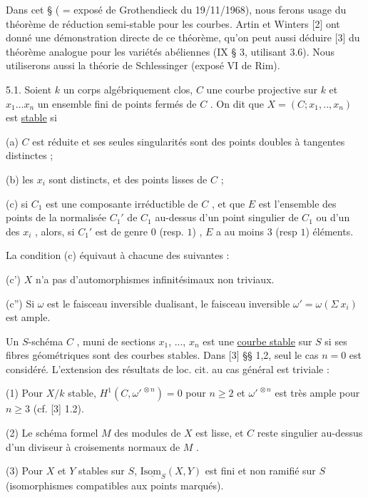 Dans cet § ( = exposé de Grothendieck du 19/11/1968), nous ferons usage du théorème de réduction semi-stable pour les courbes. Artin et Winters [2] ont donné une démonstration directe de ce théorème, qu'on peut aussi déduire [3] du théorème analogue pour les variétés abéliennes (IX § 3, utilisant 3.6). Nous utiliserons aussi la théorie de  Schlessinger (exposé VI de  Rim).

5.1.  Soient  $k$  un corps algébriquement clos, $C$ une courbe projective sur  $k$  et $x_1 \ldots x_n$  un ensemble fini de points fermés de  $C$ . On dit que  $X = (C ; x_1,.., x_n)$ est \underline{stable} si

(a) $C$ est réduite et ses seules singularités sont des points doubles à tangentes distinctes ;

(b) les  $x_i$  sont distincts, et des points lisses de  $C$ ;

(c) si  $C_1$  est une composante irréductible de  $C$ , et que  $E$  est l'ensemble des points de la normalisée  $C_1'$  de  $C_1$  au-dessus d'un point singulier de  $C_1$  ou d'un des  $x_i$ , alors, si  $C_1'$  est de genre  $0$  (resp. $1$) ,  $E$  a au moins  $3$ (resp $1$) éléments.

La condition (c) équivaut à chacune des suivantes :

(c')  $X$  n'a pas d'automorphismes infinitésimaux non triviaux.

(c'')  Si  $\omega$  est le faisceau inversible dualisant, le faisceau inversible $\omega' = \omega(\Sigma\ x_i)$  est ample.

Un  $S$-schéma  $C$ , muni de sections  $x_1$, ...,  $x_n$  est une \underline{courbe stable}  sur $S$  si ses fibres géométriques sont des courbes stables. Dans [3] §§ 1,2, seul le cas $n = 0$  est considéré. L'extension des résultats de loc. cit. au cas général est triviale :

(1) Pour  $X/k$  stable,  $H^1(C,\omega'^{\,\otimes n}) = 0$  pour  $n \geqslant 2$  et  $\omega'^{\,\otimes n}$  est très ample pour  $n \geqslant 3$  (cf. [3] 1.2).

(2) Le schéma formel  $M$  des modules de  $X$  est lisse, et  $C$  reste singulier au-dessus d'un diviseur à croisements normaux de  $M$ .



(3) Pour  $X$  et  $Y$  stables sur  $S$, $\mathrm{I}\underline{\mathrm{som}}_{S}(X,Y)$  est fini et non ramifié sur $S$  (isomorphismes compatibles aux points marqués).

